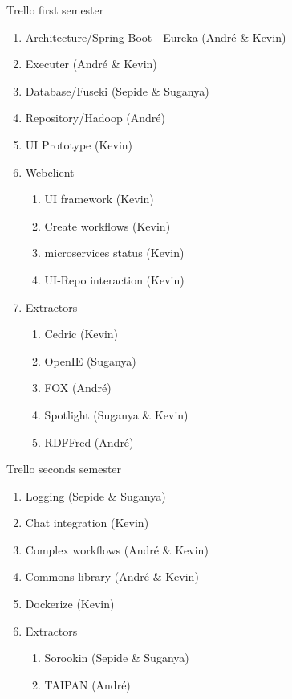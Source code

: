 \begin{frame}{Trello first semester}
	\begin{enumerate}
		\item Architecture/Spring Boot - Eureka (André \& Kevin)
		\item Executer (André \& Kevin)
		\item Database/Fuseki  (Sepide \& Suganya)
		\item Repository/Hadoop (André)
		\item UI Prototype (Kevin)
		\item Webclient
		\begin{enumerate}
			\item UI framework (Kevin)
			\item Create workflows (Kevin)
			\item microservices status (Kevin)
			\item UI-Repo interaction (Kevin)
		\end{enumerate}
		\item Extractors
		\begin{enumerate}
			\item Cedric (Kevin)
			\item OpenIE (Suganya)
			\item FOX (André)
			\item Spotlight (Suganya \& Kevin)
			\item RDFFred (André)
		\end{enumerate}
	\end{enumerate}
\end{frame}

\begin{frame}{Trello seconds semester}
	\begin{enumerate}
		\item Logging (Sepide \& Suganya)
		\item Chat integration (Kevin)
		\item Complex workflows (André \& Kevin)
		\item Commons library (André \& Kevin)
		\item Dockerize (Kevin)
		\item Extractors
		\begin{enumerate}
			\item Sorookin (Sepide \& Suganya)
			\item TAIPAN (André)
		\end{enumerate}
	\end{enumerate}
\end{frame}